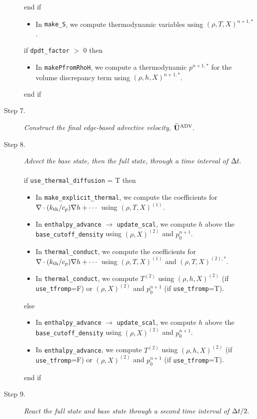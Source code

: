 \begin{description}
\begin{itemize}
\end{itemize}
end if
\begin{itemize}
\item In {\tt make\_S}, we compute thermodynamic variables using $(\rho,T,X)^{n+1,*}$.
\end{itemize}
if {\tt dpdt\_factor} $>$ 0 then
\begin{itemize}
\item In {\tt makePfromRhoH}, we compute a thermodynamic $p^{n+1,*}$ for the volume 
discrepancy term using $(\rho,h,X)^{n+1,*}$.
\end{itemize}
end if
\item[Step 7.] {\em Construct the final edge-based advective velocity, $\widetilde{\mathbf{U}}^{\mathrm{ADV}}.$}
\item[Step 8.] {\em Advect the base state, then the full state, through a time interval 
of $\Delta t.$}\\ \\
if {\tt use\_thermal\_diffusion} = T then
\begin{itemize}
\item In {\tt make\_explicit\_thermal}, we compute the coefficients for 
$\nabla\cdot(k_{\rm th}/c_p)\nabla h + \cdots$ using $(\rho,T,X)^{(1)}$.
\item In {\tt enthalpy\_advance} $\rightarrow$ {\tt update\_scal}, we compute $h$ above
the {\tt base\_cutoff\_density} using $(\rho,X)^{(2)}$ and $p_0^{n+1}$.
\item In {\tt thermal\_conduct}, we compute the coefficients for 
$\nabla\cdot(k_{\rm th}/c_p)\nabla h + \cdots$ using $(\rho,T,X)^{(1)}$ and $(\rho,T,X)^{(2),*}$.
\item In {\tt thermal\_conduct}, we compute $T^{(2)}$ using $(\rho,h,X)^{(2)}$
(if {\tt use\_tfromp}=F) or $(\rho,X)^{(2)}$ and $p_0^{n+1}$ (if {\tt use\_tfromp}=T).
\end{itemize}
else
\begin{itemize}
\item In {\tt enthalpy\_advance} $\rightarrow$ {\tt update\_scal}, we compute $h$ above
the {\tt base\_cutoff\_density} using $(\rho,X)^{(2)}$ and $p_0^{n+1}$.
\item In {\tt enthalpy\_advance}, we compute $T^{(2)}$ using $(\rho,h,X)^{(2)}$
(if {\tt use\_tfromp}=F) or $(\rho,X)^{(2)}$ and $p_0^{n+1}$ (if {\tt use\_tfromp}=T).
\end{itemize}
end if
\item[Step 9.] {\em React the full state and base state through a second time interval 
of $\Delta t/2.$}
\begin{itemize}

\end{itemize}
\end{description}
